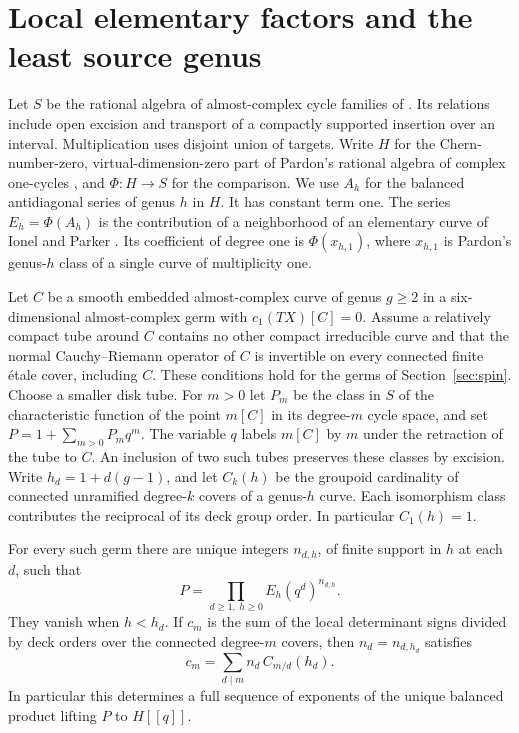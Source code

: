 \section{Local elementary factors and the least source genus}\label{sec:factors}

Let $S$ be the rational algebra of almost-complex cycle families
of \cite[\S2]{WueProduct}. Its relations include open excision and transport
of a compactly supported insertion over an interval. Multiplication
uses disjoint union of targets. Write $H$ for the Chern-number-zero,
virtual-dimension-zero part of Pardon's rational algebra of complex
one-cycles \cite{pardon}, and $\Phi:H\to S$ for the comparison.
We use $A_h$ for the balanced antidiagonal series of genus $h$ in $H$.
It has constant term one. The series $E_h=\Phi(A_h)$ is the
contribution of a neighborhood of an elementary curve of Ionel and
Parker \cite[\S3]{WueProduct}. Its coefficient of degree one is
$\Phi(x_{h,1})$, where $x_{h,1}$ is Pardon's genus-$h$ class of a
single curve of multiplicity one.

Let $C$ be a smooth embedded almost-complex curve of genus $g\ge2$
in a six-dimensional almost-complex germ with $c_1(TX)[C]=0$.
Assume a relatively compact tube around $C$ contains no other compact
irreducible curve and that the normal Cauchy--Riemann operator of $C$
is invertible on every connected finite \'etale cover, including $C$.
These conditions hold for the germs of Section~\ref{sec:spin}.
Choose a smaller disk tube. For $m>0$ let
$P_m$ be the class in $S$ of the characteristic function of the point
$m[C]$ in its degree-$m$ cycle space, and set $P=1+\sum_{m>0}P_mq^m$.
The variable $q$ labels $m[C]$ by $m$ under the retraction of the tube to $C$. An inclusion of two such
tubes preserves these classes by excision.
Write $h_d=1+d(g-1)$, and let $C_k(h)$ be the groupoid cardinality of
connected unramified degree-$k$ covers of a genus-$h$ curve. Each
isomorphism class contributes the reciprocal of its deck group order.
In particular $C_1(h)=1$.

\begin{proposition}\label{prop:factors}
For every such germ there are unique
integers $n_{d,h}$, of finite support in $h$ at each $d$, such that
\[
                  P=\prod_{d\geq1,\ h\geq0}E_h(q^d)^{n_{d,h}} .
\]
They vanish when $h<h_d$. If $c_m$ is the sum of the local determinant
signs divided by deck orders over the connected degree-$m$ covers,
then $n_d=n_{d,h_d}$ satisfies
\begin{equation}\label{eq:triangular}
           c_m=\sum_{d\mid m} n_d\,C_{m/d}(h_d).
\end{equation}
In particular this determines a full sequence of exponents of the
unique balanced product lifting $P$ to $H[[q]]$.
\end{proposition}

